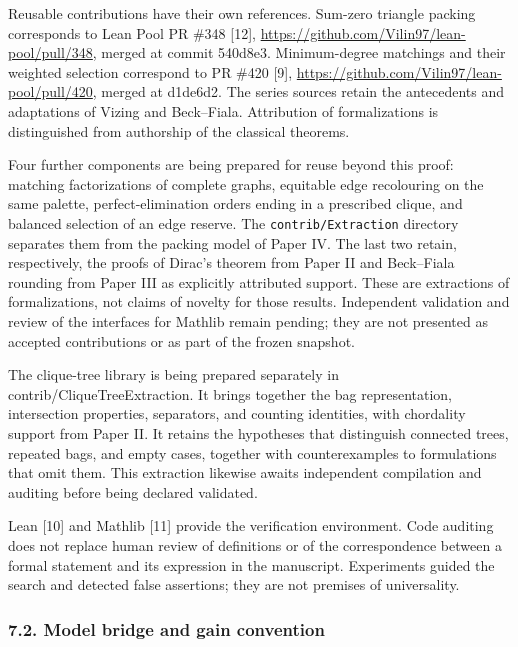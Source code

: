\documentclass[english,11pt,a4paper]{article}
\begin{document}
Reusable contributions have their own references. Sum-zero triangle packing corresponds to Lean Pool PR \#348 {[}12{]}, \url{https://github.com/Vilin97/lean-pool/pull/348}, merged at commit {\ttfamily\small 540d8e3}. Minimum-degree matchings and their weighted selection correspond to PR \#420 {[}9{]}, \url{https://github.com/Vilin97/lean-pool/pull/420}, merged at {\ttfamily\small d1de6d2}. The series sources retain the antecedents and adaptations of Vizing and Beck--Fiala. Attribution of formalizations is distinguished from authorship of the classical theorems.

Four further components are being prepared for reuse beyond this proof: matching factorizations of complete graphs, equitable edge recolouring on the same palette, perfect-elimination orders ending in a prescribed clique, and balanced selection of an edge reserve. The \nolinkurl{contrib/Extraction} directory separates them from the packing model of Paper IV. The last two retain, respectively, the proofs of Dirac's theorem from Paper II and Beck--Fiala rounding from Paper III as explicitly attributed support. These are extractions of formalizations, not claims of novelty for those results. Independent validation and review of the interfaces for Mathlib remain pending; they are not presented as accepted contributions or as part of the frozen snapshot.

The clique-tree library is being prepared separately in \mbox{contrib/}\allowbreak\mbox{CliqueTreeExtraction}. It brings together the bag representation, intersection properties, separators, and counting identities, with chordality support from Paper II. It retains the hypotheses that distinguish connected trees, repeated bags, and empty cases, together with counterexamples to formulations that omit them. This extraction likewise awaits independent compilation and auditing before being declared validated.

Lean {[}10{]} and Mathlib {[}11{]} provide the verification environment. Code auditing does not replace human review of definitions or of the correspondence between a formal statement and its expression in the manuscript. Experiments guided the search and detected false assertions; they are not premises of universality.

\subsubsection{7.2. Model bridge and gain convention}\label{model-bridge-and-gain-convention}
\end{document}
